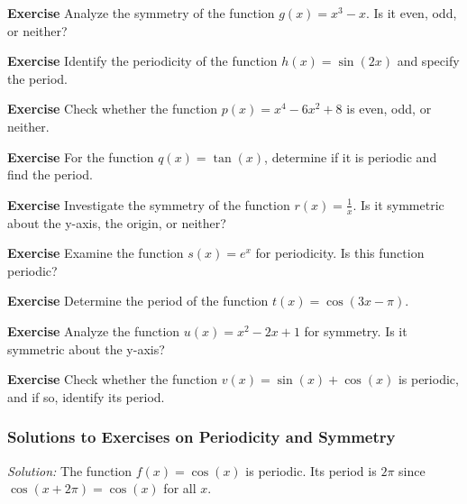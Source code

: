 \documentclass[a4paper,12pt]{book}
\newenvironment{exercise}[1][]
  {\par\medskip\noindent\textbf{Exercise #1} \rmfamily}
  {\medskip}
\newenvironment{solution}[1][]
{\par\noindent\textit{Solution:} \rmfamily}{\medskip}
\begin{document}
\begin{exercise}
Analyze the symmetry of the function \( g(x) = x^3 - x \). Is it even, odd, or neither?
\end{exercise}

\begin{exercise}
Identify the periodicity of the function \( h(x) = \sin(2x) \) and specify the period.
\end{exercise}

\begin{exercise}
Check whether the function \( p(x) = x^4 - 6x^2 + 8 \) is even, odd, or neither.
\end{exercise}

\begin{exercise}
For the function \( q(x) = \tan(x) \), determine if it is periodic and find the period.
\end{exercise}

\begin{exercise}
Investigate the symmetry of the function \( r(x) = \frac{1}{x} \). Is it symmetric about the y-axis, the origin, or neither?
\end{exercise}

\begin{exercise}
Examine the function \( s(x) = e^x \) for periodicity. Is this function periodic?
\end{exercise}

\begin{exercise}
Determine the period of the function \( t(x) = \cos(3x - \pi) \).
\end{exercise}

\begin{exercise}
Analyze the function \( u(x) = x^2 - 2x + 1 \) for symmetry. Is it symmetric about the y-axis?
\end{exercise}

\begin{exercise}
Check whether the function \( v(x) = \sin(x) + \cos(x) \) is periodic, and if so, identify its period.
\end{exercise}

\subsubsection*{Solutions to Exercises on Periodicity and Symmetry}

\begin{solution}[1]
The function \( f(x) = \cos(x) \) is periodic. Its period is \( 2\pi \) since \(\cos(x + 2\pi) = \cos(x)\) for all \(x\).
\end{solution}
\end{document}
